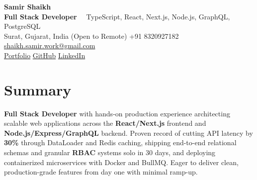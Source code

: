 \documentclass[10pt]{article}
\begin{document}
\begin{center}
  {\LARGE \textbf{Samir Shaikh}} \\ \vspace{2pt}
  {\large \textbf{Full Stack Developer}} \ \textbar\ TypeScript, React, Next.js, Node.js, GraphQL, PostgreSQL \\ \vspace{2pt}
  \small
  Surat, Gujarat, India (Open to Remote) \quad \textbullet \quad
  +91 8320927182 \quad \textbullet \quad
  \href{mailto:shaikh.samir.work@gmail.com}{shaikh.samir.work@gmail.com} \\
  \href{https://samir-portfolio-dev.vercel.app/}{Portfolio} \quad \textbullet \quad
  \href{https://github.com/samirshaikh-dev}{GitHub} \quad \textbullet \quad
  \href{https://www.linkedin.com/in/samirshaikh-dev/}{LinkedIn}
\end{center}
\vspace{-4pt}

\section{Summary}
\small
\textbf{Full Stack Developer} with hands-on production experience architecting scalable web applications across the \textbf{React/Next.js} frontend and \textbf{Node.js/Express/GraphQL} backend. Proven record of cutting API latency by \textbf{30\%} through DataLoader and Redis caching, shipping end-to-end relational schemas and granular \textbf{RBAC} systems solo in 30 days, and deploying containerized microservices with Docker and BullMQ. Eager to deliver clean, production-grade features from day one with minimal ramp-up.

\end{document}
